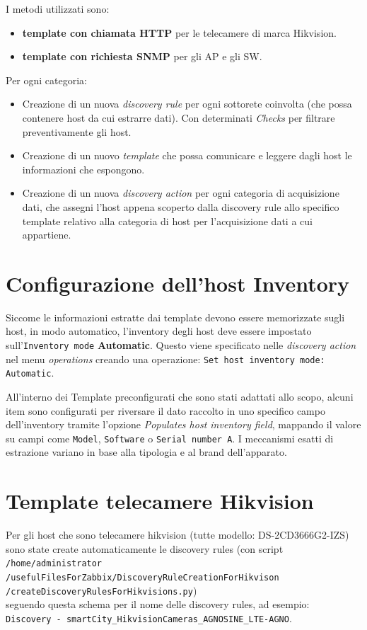 \documentclass[12pt, a4paper]{report}
\begin{document}
I metodi utilizzati sono:
\begin{itemize}
    \item  \textbf{template con chiamata HTTP} per le telecamere di marca Hikvision.
    \item  \textbf{template con richiesta SNMP} per gli AP e gli SW.
\end{itemize}
Per ogni categoria: 
\begin{itemize}
    \item Creazione di un nuova \emph{discovery rule} per ogni sottorete coinvolta 
    (che possa contenere host da cui estrarre dati). Con determinati \emph{Checks} per filtrare preventivamente
    gli host.
    \item Creazione di un nuovo \emph{template} che possa comunicare e leggere dagli host le informazioni che espongono.
    \item Creazione di un nuova \emph{discovery action} per ogni categoria di acquisizione dati,
    che assegni l'host appena scoperto dalla discovery rule allo specifico template 
    relativo alla categoria di host per l'acquisizione dati a cui appartiene.
\end{itemize}

\section{Configurazione dell'host Inventory}
Siccome le informazioni estratte dai template devono essere memorizzate sugli host, 
in modo automatico, l'inventory degli host deve essere impostato sull'\texttt{Inventory mode} \textbf{Automatic}. 
Questo viene specificato nelle \emph{discovery action} nel menu \emph{operations} creando una operazione: \texttt{Set host inventory mode: Automatic}.

All'interno dei Template preconfigurati che sono stati adattati allo scopo, alcuni item
sono configurati per riversare il dato raccolto in uno specifico
campo dell'inventory tramite l'opzione \emph{Populates host inventory field},
mappando il valore su campi come \texttt{Model}, \texttt{Software} o \texttt{Serial number A}. 
I meccanismi esatti di estrazione variano in base alla tipologia e al brand dell'apparato.

\section{Template telecamere Hikvision}
Per gli host che sono telecamere hikvision (tutte modello: DS-2CD3666G2-IZS)
sono state create automaticamente le discovery rules (con script \texttt{/home/administrator\\/usefulFilesForZabbix/DiscoveryRuleCreationForHikvison\\/createDiscoveryRulesForHikvisions.py})\\
seguendo questa schema per il nome delle discovery rules, ad esempio: \\\lstinline|Discovery - smartCity_HikvisionCameras_AGNOSINE_LTE-AGNO|.
\end{document}
